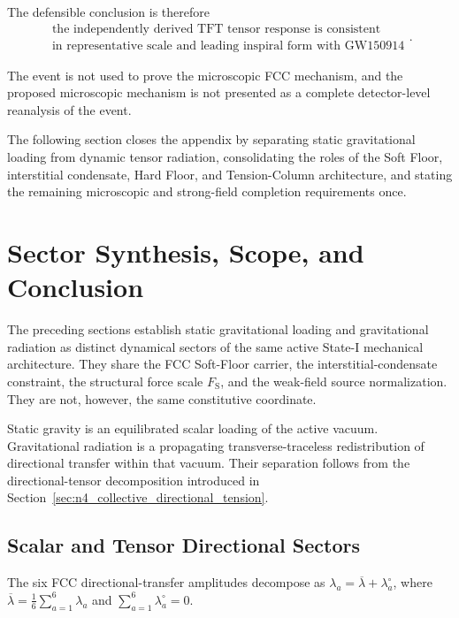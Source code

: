 The defensible conclusion is therefore
\begin{equation}
    \begin{gathered}
        \text{the independently derived TFT tensor response is consistent} \\
        \text{in representative scale and leading inspiral form with GW150914}
    \end{gathered}.
    \label{eq:n11_consistency_conclusion}
\end{equation}

The event is not used to prove the microscopic FCC mechanism, and the proposed microscopic mechanism is not presented as a complete detector-level reanalysis of the event.

The following section closes the appendix by separating static gravitational loading from dynamic tensor radiation, consolidating the roles of the Soft Floor, interstitial condensate, Hard Floor, and Tension-Column architecture, and stating the remaining microscopic and strong-field completion requirements once.

\section{Sector Synthesis, Scope, and Conclusion}
\label{sec:n12_static_dynamic_gravity}

The preceding sections establish static gravitational loading and gravitational radiation as distinct dynamical sectors of the same active State-I mechanical architecture. They share the FCC Soft-Floor carrier, the interstitial-condensate constraint, the structural force scale $F_{\mathrm{S}}$, and the weak-field source normalization. They are not, however, the same constitutive coordinate.

Static gravity is an equilibrated scalar loading of the active vacuum. Gravitational radiation is a propagating transverse-traceless redistribution of directional transfer within that vacuum. Their separation follows from the directional-tensor decomposition introduced in Section~\ref{sec:n4_collective_directional_tension}.

\subsection{Scalar and Tensor Directional Sectors}
\label{subsec:n12_scalar_tensor_separation}

The six FCC directional-transfer amplitudes decompose as $\lambda_{a} = \overline{\lambda} + \lambda_{a}^{\circ}$, where $\overline{\lambda} = \frac{1}{6} \sum_{a=1}^{6} \lambda_{a}$ and $\sum_{a=1}^{6} \lambda_{a}^{\circ} = 0$.

